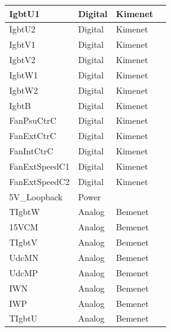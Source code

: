 \begin{table}[]
\begin{tabular}{|l|l|l|l|}
IgbtU1         & Digital      & Kimenet      &                                 \\ \hline
IgbtU2         & Digital      & Kimenet      &                                 \\ \hline
IgbtV1         & Digital      & Kimenet      &                                 \\ \hline
IgbtV2         & Digital      & Kimenet      &                                 \\ \hline
IgbtW1         & Digital      & Kimenet      &                                 \\ \hline
IgbtW2         & Digital      & Kimenet      &                                 \\ \hline
IgbtB          & Digital      & Kimenet      &                                 \\ \hline
FanPsuCtrC     & Digital      & Kimenet      &                                 \\ \hline
FanExtCtrC     & Digital      & Kimenet      &                                 \\ \hline
FanIntCtrC     & Digital      & Kimenet      &                                 \\ \hline
FanExtSpeedC1  & Digital      & Kimenet      &                                 \\ \hline
FanExtSpeedC2  & Digital      & Kimenet      &                                 \\ \hline
5V\_Loopback   & Power        &              &                                 \\ \hline
TIgbtW         & Analog       & Bemenet      &                                 \\ \hline
15VCM          & Analog       & Bemenet      &                                 \\ \hline
TIgbtV         & Analog       & Bemenet      &                                 \\ \hline
UdcMN          & Analog       & Bemenet      &                                 \\ \hline
UdcMP          & Analog       & Bemenet      &                                 \\ \hline
IWN            & Analog       & Bemenet      &                                 \\ \hline
IWP            & Analog       & Bemenet      &                                 \\ \hline
TIgbtU         & Analog       & Bemenet      &                                 \\ \hline

\end{tabular}
\end{table}
